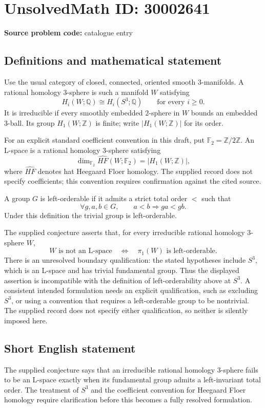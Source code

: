 \documentclass[11pt]{article}
\newcommand{\Z}{\mathbb{Z}}
\newcommand{\Q}{\mathbb{Q}}
\newcommand{\F}{\mathbb{F}}
\begin{document}
\section*{UnsolvedMath ID: 30002641}
\textbf{Source problem code:} catalogue entry
\subsection{Definitions and mathematical statement}
Use the usual category of closed, connected, oriented smooth \(3\)-manifolds. A rational homology \(3\)-sphere is such a manifold \(W\) satisfying
\[
H_i(W;\Q)\cong H_i(S^3;\Q)\qquad\text{for every }i\geq 0.
\]
It is irreducible if every smoothly embedded \(2\)-sphere in \(W\) bounds an embedded \(3\)-ball. Its group \(H_1(W;\Z)\) is finite; write \(\lvert H_1(W;\Z)\rvert\) for its order.

For an explicit standard coefficient convention in this draft, put \(\F_2=\Z/2\Z\). An L-space is a rational homology \(3\)-sphere satisfying
\[
\dim_{\F_2}\widehat{HF}(W;\F_2)=\lvert H_1(W;\Z)\rvert,
\]
where \(\widehat{HF}\) denotes hat Heegaard Floer homology. The supplied record does not specify coefficients; this convention requires confirmation against the cited source.

A group \(G\) is left-orderable if it admits a strict total order \(<\) such that
\[
\forall g,a,b\in G,\qquad a<b\Longrightarrow ga<gb.
\]
Under this definition the trivial group is left-orderable.

The supplied conjecture asserts that, for every irreducible rational homology \(3\)-sphere \(W\),
\[
W\text{ is not an L-space}
\quad\Longleftrightarrow\quad
\pi_1(W)\text{ is left-orderable}.
\]
There is an unresolved boundary qualification: the stated hypotheses include \(S^3\), which is an L-space and has trivial fundamental group. Thus the displayed assertion is incompatible with the definition of left-orderability above at \(S^3\). A consistent intended formulation needs an explicit qualification, such as excluding \(S^3\), or using a convention that requires a left-orderable group to be nontrivial. The supplied record does not specify either qualification, so neither is silently imposed here.
\subsection{Short English statement}
The supplied conjecture says that an irreducible rational homology \(3\)-sphere fails to be an L-space exactly when its fundamental group admits a left-invariant total order. The treatment of \(S^3\) and the coefficient convention for Heegaard Floer homology require clarification before this becomes a fully resolved formulation.
\end{document}
